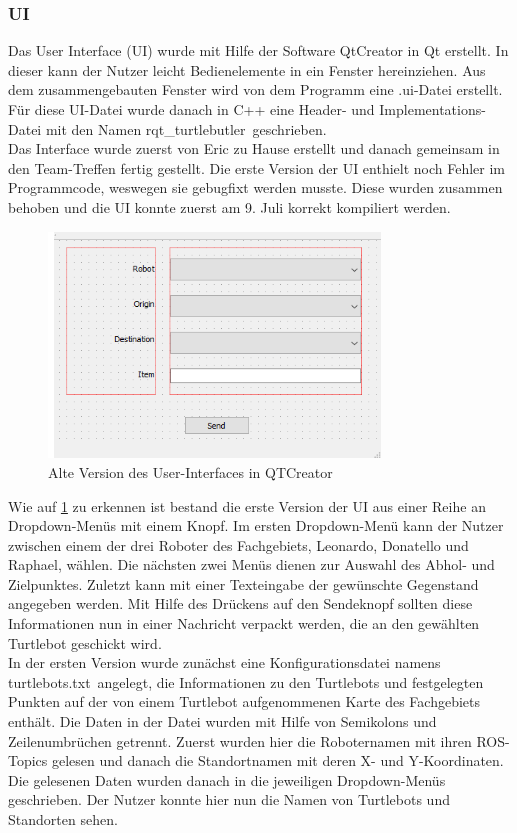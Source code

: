 \documentclass[a4paper,12pt,headsepline]{scrartcl}
\begin{document}
	\subsubsection{UI}
		Das User Interface (UI) wurde mit Hilfe der Software QtCreator in Qt erstellt. In dieser kann der Nutzer leicht Bedienelemente in ein Fenster hereinziehen. Aus dem zusammengebauten Fenster wird von dem Programm eine \glqq .ui\grqq-Datei erstellt. Für diese UI-Datei wurde danach in C++ eine Header- und Implementations-Datei mit den Namen \glqq rqt{\_}turtlebutler\grqq\ geschrieben.\\
		Das Interface wurde zuerst von Eric zu Hause erstellt und danach gemeinsam in den Team-Treffen fertig gestellt. Die erste Version der UI enthielt noch Fehler im Programmcode, weswegen sie gebugfixt werden musste. Diese wurden zusammen behoben und die UI konnte zuerst am 9. Juli korrekt kompiliert werden.
		\begin{figure} [H]
			\centering
			\includegraphics[height=6cm]{Images/Turtlebutler_Old.png}
			\caption{Alte Version des User-Interfaces in QTCreator}
			\label{fig:OldUI}
		\end{figure}
		Wie auf \cref{fig:OldUI} zu erkennen ist bestand die erste Version der UI aus einer Reihe an Dropdown-Menüs mit einem Knopf. Im ersten Dropdown-Menü kann der Nutzer zwischen einem der drei Roboter des Fachgebiets, Leonardo, Donatello und Raphael, wählen. Die nächsten zwei Menüs dienen zur Auswahl des Abhol- und Zielpunktes. Zuletzt kann mit einer Texteingabe der gewünschte Gegenstand angegeben werden. Mit Hilfe des Drückens auf den Sendeknopf sollten diese Informationen nun in einer Nachricht verpackt werden, die an den gewählten Turtlebot geschickt wird.\\
		In der ersten Version wurde zunächst eine Konfigurationsdatei namens \glqq turtlebots.txt\grqq\ angelegt, die Informationen zu den Turtlebots und festgelegten Punkten auf der von einem Turtlebot aufgenommenen Karte des Fachgebiets enthält. Die Daten in der Datei wurden mit Hilfe von Semikolons und Zeilenumbrüchen getrennt. Zuerst wurden hier die Roboternamen mit ihren ROS-Topics gelesen und danach die Standortnamen mit deren X- und Y-Koordinaten.  Die gelesenen Daten wurden danach in die jeweiligen Dropdown-Menüs geschrieben. Der Nutzer konnte hier nun die Namen von Turtlebots und Standorten sehen.\\
\end{document}
